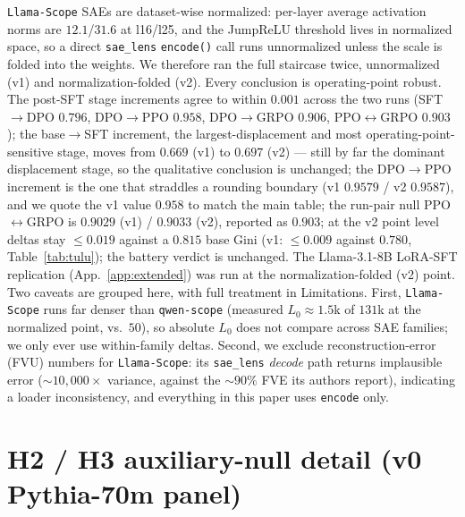 \documentclass{article}
\begin{document}
\texttt{Llama-Scope} SAEs are dataset-wise normalized: per-layer average activation norms are $12.1$/$31.6$ at l16/l25, and the JumpReLU threshold lives in normalized space, so a direct \texttt{sae\_lens} \texttt{encode()} call runs unnormalized unless the scale is folded into the weights. We therefore ran the full staircase twice, unnormalized (v1) and normalization-folded (v2). Every conclusion is operating-point robust. The post-SFT stage increments agree to within $0.001$ across the two runs (SFT$\to$DPO $0.796$, DPO$\to$PPO $0.958$, DPO$\to$GRPO $0.906$, PPO$\leftrightarrow$GRPO $0.903$); the base$\to$SFT increment, the largest-displacement and most operating-point-sensitive stage, moves from $0.669$ (v1) to $0.697$ (v2) --- still by far the dominant displacement stage, so the qualitative conclusion is unchanged; the DPO$\to$PPO increment is the one that straddles a rounding boundary (v1 $0.9579$ / v2 $0.9587$), and we quote the v1 value $0.958$ to match the main table; the run-pair null PPO$\leftrightarrow$GRPO is $0.9029$ (v1) / $0.9033$ (v2), reported as $0.903$; at the v2 point level deltas stay $\le0.019$ against a $0.815$ base Gini (v1: $\le0.009$ against $0.780$, Table~\ref{tab:tulu}); the battery verdict is unchanged. The Llama-3.1-8B LoRA-SFT replication (App.~\ref{app:extended}) was run at the normalization-folded (v2) point. Two caveats are grouped here, with full treatment in Limitations. First, \texttt{Llama-Scope} runs far denser than \texttt{qwen-scope} (measured $L_0\approx1.5$k of $131$k at the normalized point, vs.\ $50$), so absolute $L_0$ does not compare across SAE families; we only ever use within-family deltas. Second, we exclude reconstruction-error (FVU) numbers for \texttt{Llama-Scope}: its \texttt{sae\_lens} \emph{decode} path returns implausible error (${\sim}10{,}000\times$ variance, against the ${\sim}90\%$ FVE its authors report), indicating a loader inconsistency, and everything in this paper uses \texttt{encode} only.

\section{H2 / H3 auxiliary-null detail (v0 Pythia-70m panel)}
\label{app:h2h3}
\end{document}
